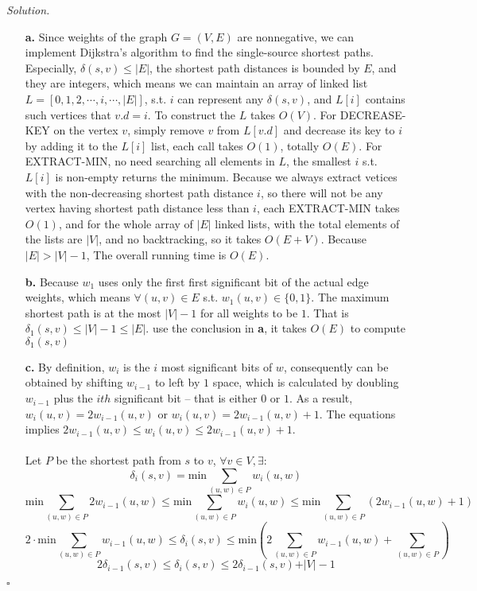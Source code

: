 \documentclass[11pt]{article}
\theoremstyle{definition}
\newenvironment{solution}{\noindent\emph{Solution.}}{\hfill$\square$}
\newcommand\tab[1][1cm]{\hspace*{#1}}
\begin{document}
\begin{solution}
\begin{enumerate}

 \item[\textbf{a.}] \tab Since weights of the graph $G=(V,E)$ are nonnegative, we can implement Dijkstra's algorithm to find the single-source shortest paths.\\
 \tab Especially, $\delta(s,v) \leq \vert E \vert$, the shortest path distances is bounded by $E$, and they are integers, which means we can maintain an array of linked list $L = [0,1,2, \cdots,i, \cdots, \vert E \vert]$, s.t. $i$ can represent any $\delta(s,v)$, and $L[i]$ contains such vertices that $v.d = i$. To construct the $L$ takes $O(V)$. For DECREASE-KEY on the vertex $v$, simply remove $v$ from $L[v.d]$ and decrease its key to $i$ by adding it to the $L[i]$ list, each call takes $O(1)$, totally $O(E)$. For EXTRACT-MIN, no need searching all elements in $L$, the smallest $i$ s.t. $L[i]$ is non-empty returns the minimum. Because we always extract vetices with the non-decreasing shortest path distance $i$, so there will not be any vertex having shortest path distance less than $i$, each EXTRACT-MIN takes $O(1)$, and for the whole array of $\vert E \vert$ linked lists, with the total elements of the lists are $\vert V \vert$, and no backtracking, so it takes $O(E+V)$. Because $\vert  E \vert > \vert  V \vert - 1$, The overall running time is $O(E)$.
 
  \item[\textbf{b.}] \tab Because $w_1$ uses only the first first significant bit of the actual edge weights, which means $\forall (u,v) \in E$ s.t. $ w_1(u, v) \in \{  0,1 \}$. The maximum shortest path is at the most $\vert V \vert - 1$ for all weights to be $1$. That is $\delta_1(s,v) \leq \vert V \vert - 1 \leq \vert E \vert $. use the conclusion in \textbf{a}, it takes $O(E)$ to compute $\delta_1(s,v)$
  
   \item[\textbf{c.}]  \tab By definition, $w_i$ is the $i$ most significant bits of $w$, consequently can be obtained by shifting $w_{i-1}$ to left by $1$ space, which is calculated by doubling $w_{i-1} $ plus the $ith$ significant bit -- that is either $0$ or $1$. As a result, $w_i(u,v) = 2w_{i-1}(u, v)$ or $w_i(u,v) = 2w_{i-1}(u, v)+1$.
   \tab The equations implies $2w_{i-1}(u, v) \leq w_i(u,v) \leq 2w_{i-1}(u, v)+1$.\\ \\
   \tab Let $P$ be the shortest path from $s$ to $v$, $\forall  v \in V, \exists$:
  $$ \delta_i(s,v) = \mbox{min} \sum _{(u,w) \in P} w_i (u, w)$$
  $$ \mbox{min} \sum _{(u, w) \in P} 2w_{i-1} (u, w) \leq  \mbox{min} \sum _{(u,w) \in P} w_i (u, w) \leq   \mbox{min} \sum _{(u,w) \in P} (2w_{i-1} (u,w) + 1)$$
  $$ 2 \cdot  \mbox{min} \sum _{(u,w) \in P} w_{i-1} (u,w) \leq   \delta_i(s,v) \leq   \mbox{min} (2\sum _{(u,w) \in P} w_{i-1} (u,w) + \sum _{(u,w) \in P} )$$
  $$ 2 \delta _{i-1} (s,v)    \leq   \delta_i(s,v) \leq 2 \delta _{i-1} (s,v)  + \vert V \vert -1$$
  

\end{enumerate}
\end{solution}
\end{document}
